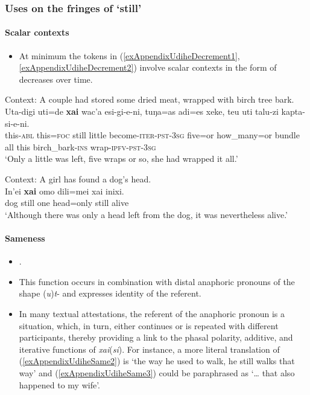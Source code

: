 \subsubsection{Uses on the fringes of \lq{}still\rq{}}
\paragraph{Scalar contexts}\label{appendixUdiheScalar}
\begin{itemize}
	\item At minimum the tokens in (\ref{exAppendixUdiheDecrement1}, \ref{exAppendixUdiheDecrement2}) involve scalar contexts in the form of decreases over time.
\end{itemize}

\begin{exe}

	\ex\label{exAppendixUdiheDecrement1}
	Context: A couple had stored some dried meat, wrapped with birch tree bark.\\
	\gll Uta-digi uti=de \textbf{xai} wac'a esi-gi-e-ni, tuŋa=as adi=es xeke, teu uti talu-zi kapta-si-e-ni.\\
	this-\textsc{abl} this=\textsc{foc} still little become-\textsc{iter}-\textsc{pst}-3\textsc{sg} five=or how\_many=or bundle all this birch\_bark-\textsc{ins} wrap-\textsc{ipfv}-\textsc{pst}-3\textsc{sg}\\
	\glt \lq Only a little was left, five wraps or so, she had wrapped it all.' \parencite[An old woman and her tiger cub]{NikolaevaEtAl2019}

	\ex\label{exAppendixUdiheDecrement2}
	Context: A girl has found a dog’s head.\\
	\gll In’ei \textbf{xai} omo dili=mei xai inixi.\\
	dog still one head=only still alive\\
	\glt \lq Although there was only a head left from the dog, it was nevertheless alive.' \parencite[The fairy and the ten bald spirits]{NikolaevaEtAl2019}

\end{exe}


\paragraph{Sameness}\label{appendixUdiheSame}
\begin{itemize}
	\item \textcite[440–441]{NikolaevaTolskaya2001}.
	\item This function occurs in combination with distal anaphoric pronouns of the shape \mbox{(\textit{u})\textit{t}-} and expresses identity of the referent.	
	\item In many textual attestations, the referent of the anaphoric pronoun is a situation, which, in turn, either continues or is repeated with different participants, thereby providing a link to the phasal polarity, additive, and iterative functions of \mbox{\textit{xai}(\textit{si})}. For instance, a more literal translation of (\ref{exAppendixUdiheSame2}) is \lq the way he used to walk, he still walks that way' and  (\ref{exAppendixUdiheSame3}) could be paraphrased as \lq … that also happened to my wife'.
\end{itemize}

